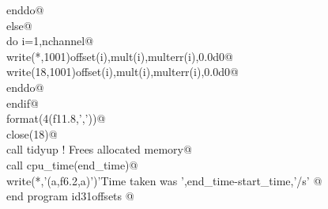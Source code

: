 \documentclass[10pt,a4paper,notitlepage]{article}
\begin{document}
\begin{flushleft}
\begin{list}{}{}
\mbox{}\verb@        enddo@\\
\mbox{}\verb@       else@\\
\mbox{}\verb@        do i=1,nchannel@\\
\mbox{}\verb@          write(*,1001)offset(i),mult(i),multerr(i),0.0d0@\\
\mbox{}\verb@          write(18,1001)offset(i),mult(i),multerr(i),0.0d0@\\
\mbox{}\verb@        enddo@\\
\mbox{}\verb@      endif@\\
\mbox{} format(4(f11.8,','))@\\
\mbox{}\verb@      close(18)@\\
\mbox{}\verb@      call tidyup                                ! Frees allocated memory@\\
\mbox{}\verb@      call cpu_time(end_time)@\\
\mbox{}\verb@      write(*,'(a,f6.2,a)')'Time taken was ',end_time-start_time,'/s'      @\\
\mbox{}\verb@      end program id31offsets                                                @{\NWsep}
\end{list}
\vspace{-1.5ex}
\footnotesize
\begin{list}{}{\setlength{\itemsep}{-\parsep}\setlength{\itemindent}{-\leftmargin}}

\item{}
\end{list}
\vspace{4ex}
\end{flushleft}
\end{document}
